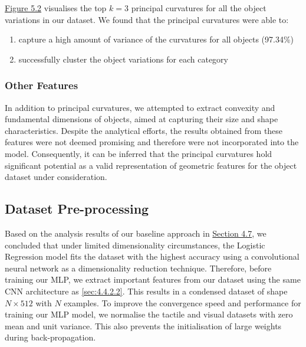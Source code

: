 \documentclass[11pt, a4paper]{report}
\begin{document}
\hyperref[fig:5.2]{Figure 5.2} visualises the top $k=3$ principal curvatures for all the object variations in our dataset. We found that the principal curvatures were able to:
\begin{enumerate}[\itemsep=0em]
    \item capture a high amount of variance of the curvatures for all objects (97.34\%)
    \item successfully cluster the object variations for each category
\end{enumerate}


\subsubsection{Other Features}\label{sec:5.2.3.2}
In addition to principal curvatures, we attempted to extract convexity and fundamental dimensions of objects, aimed at capturing their size and shape characteristics. Despite the analytical efforts, the results obtained from these features were not deemed promising and therefore were not incorporated into the model. Consequently, it can be inferred that the principal curvatures hold significant potential as a valid representation of geometric features for the object dataset under consideration.


\subsection{Dataset Pre-processing}\label{sec:5.2.4}
Based on the analysis results of our baseline approach in \hyperref[sec:4.7]{Section 4.7}, we concluded that under limited dimensionality circumstances, the Logistic Regression model fits the dataset with the highest accuracy using a convolutional neural network as a dimensionality reduction technique. Therefore, before training our MLP, we extract important features from our dataset using the same CNN architecture as \ref{sec:4.4.2.2}. This results in a condensed dataset of shape $N\times512$ with $N$ examples. To improve the convergence speed and performance for training our MLP model, we normalise the tactile and visual datasets with zero mean and unit variance. This also prevents the initialisation of large weights during back-propagation.
\end{document}
